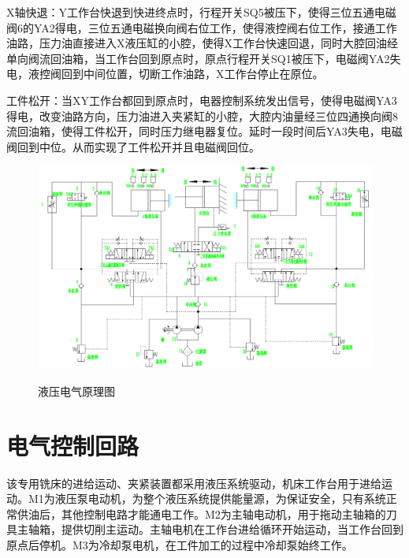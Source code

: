 X轴快退：Y工作台快退到快进终点时，行程开关SQ5被压下，使得三位五通电磁阀6的YA2得电，三位五通电磁换向阀右位工作，使得液控阀右位工作，接通工作油路，压力油直接进入X液压缸的小腔，使得X工作台快速回退，同时大腔回油经单向阀流回油箱，当工作台回到原点时，原点行程开关SQ1被压下，电磁阀YA2失电，液控阀回到中间位置，切断工作油路，X工作台停止在原位。
	
工件松开：当XY工作台都回到原点时，电器控制系统发出信号，使得电磁阀YA3得电，改变油路方向，压力油进入夹紧缸的小腔，大腔内油量经三位四通换向阀8流回油箱，使得工件松开，同时压力继电器复位。延时一段时间后YA3失电，电磁阀回到中位。从而实现了工件松开并且电磁阀回位。



\clearpage

\begin{figure}
	\centering
	\includegraphics[width=1\linewidth]{graphics/xtyl.png} \\
	\caption{液压电气原理图}
	\thispagestyle{empty}
\end{figure}




\clearpage
\section{电气控制回路}
该专用铣床的进给运动、夹紧装置都采用液压系统驱动，机床工作台用于进给运动。M1为液压泵电动机，为整个液压系统提供能量源，为保证安全，只有系统正常供油后，其他控制电路才能通电工作。M2为主轴电动机，用于拖动主轴箱的刀具主轴箱，提供切削主运动。主轴电机在工作台进给循环开始运动，当工作台回到原点后停机。M3为冷却泵电机，在工件加工的过程中冷却泵始终工作。

